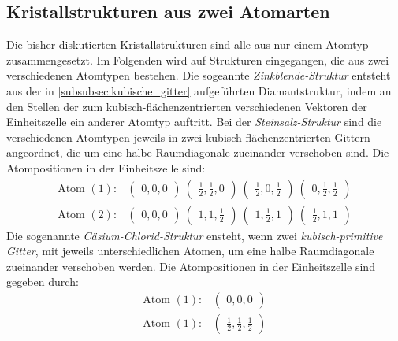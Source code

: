 \subsection{Kristallstrukturen aus zwei Atomarten}
\label{subsec:2atome}
Die bisher diskutierten Kristallstrukturen sind alle aus nur
einem Atomtyp zusammengesetzt. Im Folgenden wird auf Strukturen
eingegangen, die aus zwei verschiedenen Atomtypen bestehen.
Die sogeannte \textit{Zinkblende-Struktur} entsteht aus der
in \ref{subsubsec:kubische_gitter}
aufgeführten Diamantstruktur, indem an den Stellen der zum
kubisch-flächenzentrierten verschiedenen Vektoren der Einheitszelle
ein anderer Atomtyp auftritt.
Bei der \textit{Steinsalz-Struktur}
sind die verschiedenen Atomtypen
jeweils in zwei kubisch-flächenzentrierten Gittern angeordnet, die um eine
halbe Raumdiagonale zueinander verschoben sind. Die Atompositionen
in der Einheitszelle sind:
\begin{align}
\label{eqn:5*}
\text{Atom }(1) :&
\begin{pmatrix}
0, 0, 0
\end{pmatrix}\
\begin{pmatrix}
\frac{1}{2}, \frac{1}{2}, 0
\end{pmatrix}\
\begin{pmatrix}
\frac{1}{2}, 0, \frac{1}{2}
\end{pmatrix}\
\begin{pmatrix}
0, \frac{1}{2}, \frac{1}{2}
\end{pmatrix}\\
\label{eqn:6*}
\text{Atom }(2) :&
\begin{pmatrix}
0, 0, 0
\end{pmatrix}\
\begin{pmatrix}
1, 1, \frac{1}{2}
\end{pmatrix}\
\begin{pmatrix}
1, \frac{1}{2}, 1
\end{pmatrix}\
\begin{pmatrix}
\frac{1}{2}, 1, 1
\end{pmatrix}
\end{align}
Die sogenannte \textit{Cäsium-Chlorid-Struktur}
ensteht, wenn zwei \textit{kubisch-primitive Gitter}, mit jeweils
unterschiedlichen Atomen, um eine halbe Raumdiagonale zueinander
verschoben werden. Die Atompositionen in der Einheitszelle
sind gegeben durch:
\begin{align}
\label{eqn:7*}
\text{Atom }(1) :&
\begin{pmatrix}
0, 0, 0
\end{pmatrix}\\
\label{eqn:8*}
\text{Atom }(1) :&
\begin{pmatrix}
\frac{1}{2}, \frac{1}{2}, \frac{1}{2}
\end{pmatrix}
\end{align}
